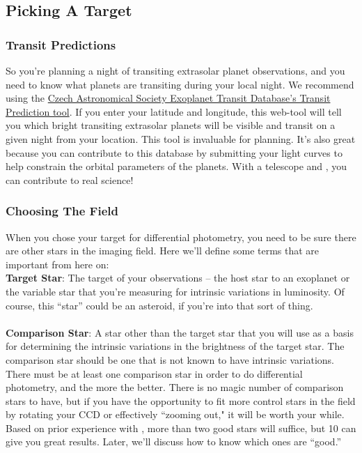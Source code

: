 \documentclass[a4paper]{article}
\begin{document}
\subsection{Picking A Target}
\subsubsection{Transit Predictions}
So you're planning a night of transiting extrasolar planet observations, and you need to know what planets are transiting during your local night. We recommend using the \href{http://var2.astro.cz/ETD/predictions.php}{Czech Astronomical Society Exoplanet Transit Database's Transit Prediction tool}. If you enter your latitude and longitude, this web-tool will tell you which bright transiting extrasolar planets will be visible and transit on a given night from your location. This tool is invaluable for planning. It's also great because you can contribute to this database by submitting your light curves to help constrain the orbital parameters of the planets. With a telescope and \oscaar, you can contribute to real science!

\subsubsection{Choosing The Field}
When you chose your target for differential photometry, you need to be sure there are other stars in the imaging field. Here we'll define some terms that are important from here on:  \\ 

\noindent \textbf{Target Star}: The target of your observations -- the host star to an exoplanet or the variable star that you're measuring for intrinsic variations in luminosity. Of course, this ``star'' could be an asteroid, if you're into that sort of thing. \\\\
\textbf{Comparison Star}: A star other than the target star that you will use as a basis for determining the intrinsic variations in the brightness of the target star. The comparison star should be one that is not known to have intrinsic variations. \\

There must be at least one comparison star in order to do differential photometry, and the more the better. There is no magic number of comparison stars to have, but if you have the opportunity to fit more control stars in the field by rotating your CCD or effectively ``zooming out," it will be worth your while. Based on prior experience with \oscaar, more than two good stars will suffice, but 10 can give you great results. Later, we'll discuss how to know which ones are ``good.''
\end{document}
